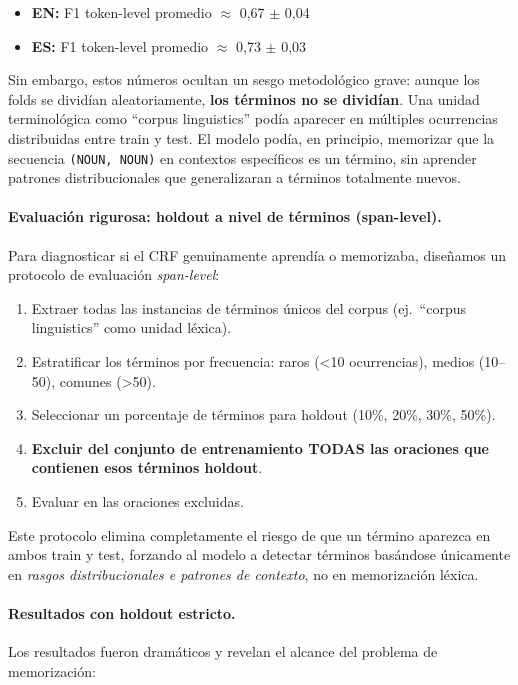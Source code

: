 \begin{itemize}
    \item \textbf{EN:} F1 token-level promedio $\approx$ 0{,}67 $\pm$ 0{,}04
    \item \textbf{ES:} F1 token-level promedio $\approx$ 0{,}73 $\pm$ 0{,}03
\end{itemize}

Sin embargo, estos números ocultan un sesgo metodológico grave: aunque los folds se dividían aleatoriamente, \textbf{los términos no se dividían}. Una unidad terminológica como ``corpus linguistics'' podía aparecer en múltiples ocurrencias distribuidas entre train y test. El modelo podía, en principio, memorizar que la secuencia \texttt{(NOUN, NOUN)} en contextos específicos es un término, sin aprender patrones distribucionales que generalizaran a términos totalmente nuevos.

\paragraph{Evaluación rigurosa: holdout a nivel de términos (span-level).}
Para diagnosticar si el CRF genuinamente aprendía o memorizaba, diseñamos un protocolo de evaluación \emph{span-level}:

\begin{enumerate}
    \item Extraer todas las instancias de términos únicos del corpus (ej.\ ``corpus linguistics'' como unidad léxica).
    \item Estratificar los términos por frecuencia: raros (<10 ocurrencias), medios (10--50), comunes (>50).
    \item Seleccionar un porcentaje de términos para holdout (10\%, 20\%, 30\%, 50\%).
    \item \textbf{Excluir del conjunto de entrenamiento TODAS las oraciones que contienen esos términos holdout}.
    \item Evaluar en las oraciones excluidas.
\end{enumerate}

Este protocolo elimina completamente el riesgo de que un término aparezca en ambos train y test, forzando al modelo a detectar términos basándose únicamente en \emph{rasgos distribucionales e patrones de contexto}, no en memorización léxica.

\paragraph{Resultados con holdout estricto.}
Los resultados fueron dramáticos y revelan el alcance del problema de memorización:

